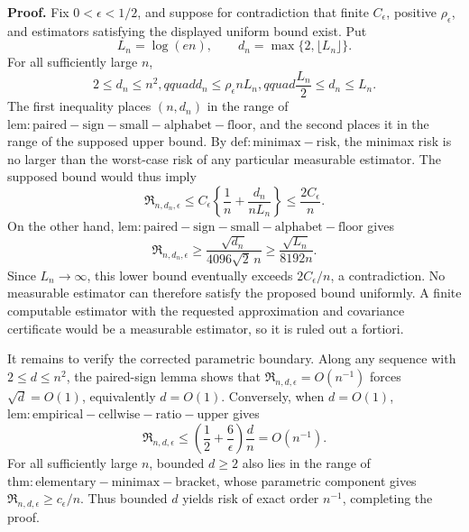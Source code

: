 \textbf{Proof.}
Fix \(0<\epsilon<1/2\), and suppose for contradiction that finite \(C_\epsilon\), positive \(\rho_\epsilon\), and estimators satisfying the displayed uniform bound exist.  Put
\[
 L_n=\log(en),\qquad d_n=\max\{2,\lfloor L_n\rfloor\}.
\]
For all sufficiently large \(n\),
\[
 2\le d_n\le n^2,qquad
 d_n\le\rho_\epsilon nL_n,qquad
 \frac{L_n}{2}\le d_n\le L_n.
\]
The first inequality places \((n,d_n)\) in the range of \(\mathrm{lem:paired-sign-small-alphabet-floor}\), and the second places it in the range of the supposed upper bound.  By \(\mathrm{def:minimax-risk}\), the minimax risk is no larger than the worst-case risk of any particular measurable estimator.  The supposed bound would thus imply
\[
 \mathfrak R_{n,d_n,\epsilon}
 \le C_\epsilon\left\{\frac1n+\frac{d_n}{nL_n}\right\}
 \le\frac{2C_\epsilon}{n}.
\]
On the other hand, \(\mathrm{lem:paired-sign-small-alphabet-floor}\) gives
\[
 \mathfrak R_{n,d_n,\epsilon}
 \ge\frac{\sqrt{d_n}}{4096\sqrt2\,n}
 \ge\frac{\sqrt{L_n}}{8192n}.
\]
Since \(L_n\to\infty\), this lower bound eventually exceeds \(2C_\epsilon/n\), a contradiction.  No measurable estimator can therefore satisfy the proposed bound uniformly.  A finite computable estimator with the requested approximation and covariance certificate would be a measurable estimator, so it is ruled out a fortiori.

It remains to verify the corrected parametric boundary.  Along any sequence with \(2\le d\le n^2\), the paired-sign lemma shows that \(\mathfrak R_{n,d,\epsilon}=O(n^{-1})\) forces \(\sqrt d=O(1)\), equivalently \(d=O(1)\).  Conversely, when \(d=O(1)\), \(\mathrm{lem:empirical-cellwise-ratio-upper}\) gives
\[
 \mathfrak R_{n,d,\epsilon}
 \le \left(\frac12+\frac6\epsilon\right)\frac dn
 =O(n^{-1}).
\]
For all sufficiently large \(n\), bounded \(d\ge2\) also lies in the range of \(\mathrm{thm:elementary-minimax-bracket}\), whose parametric component gives \(\mathfrak R_{n,d,\epsilon}\ge c_\epsilon/n\).  Thus bounded \(d\) yields risk of exact order \(n^{-1}\), completing the proof.